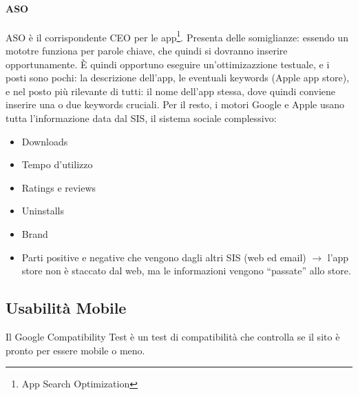 \paragraph*{ASO}ASO \`e il corrispondente CEO per le app\footnote{App Search Optimization}. Presenta delle somiglianze: essendo un mototre funziona per parole chiave, che quindi si dovranno inserire opportunamente. \`E quindi opportuno eseguire un'ottimizazzione testuale, e i posti sono pochi: la descrizione dell'app, le eventuali keywords (Apple app store), e nel posto pi\`u rilevante di tutti: il nome dell'app stessa, dove quindi conviene inserire una o due keywords cruciali. Per il resto, i motori Google e Apple usano tutta l'informazione data dal SIS, il sistema sociale complessivo:
\begin{itemize}

\item Downloads
\item Tempo d'utilizzo
\item Ratings e reviews
\item Uninstalls
\item Brand
\item Parti positive e negative che vengono dagli altri SIS (web ed email) $\to$ l'app store non \`e staccato dal web, ma le informazioni vengono ``passate'' allo store.
  
\end{itemize}

\subsection{Usabilit\`a Mobile}

Il Google Compatibility Test \`e un test di compatibilit\`a che controlla se il sito \`e pronto per essere mobile o meno.

